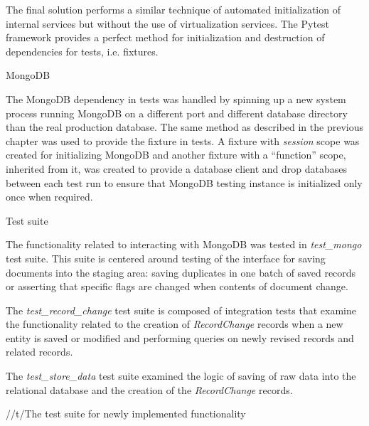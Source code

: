 The final solution performs a similar technique of automated initialization of internal services but without the use of virtualization services. The Pytest framework provides a perfect method for initialization and destruction of dependencies for tests, i.e. fixtures.


\beginsection
MongoDB

The MongoDB dependency in tests was handled by spinning up a new system process running MongoDB on a different port and different database directory than the real production database. The same method as described in the previous chapter was used to provide the fixture in tests. A fixture with {\it session} scope was created for initializing MongoDB and another fixture with a “function” scope, inherited from it, was created to provide a database client and drop databases between each test run to ensure that MongoDB testing instance is initialized only once when required.

\secc Test suite

The functionality related to interacting with MongoDB was tested in {\it test\_mongo} test suite. This suite is centered  around testing of the interface for saving documents into the staging area: saving duplicates in one batch of saved records or asserting that specific flags are changed when contents of document change. 

The {\it test\_record\_change} test suite is composed of integration tests that examine the functionality related to the creation of {\it RecordChange} records when a new entity is saved or modified and performing queries on newly revised records and related records. 

The {\it test\_store\_data} test suite examined the logic of saving of raw data into the relational database and the creation of the {\it RecordChange} records. 

\medskip
\centerline{
}
\raggedcenter/{\figure/t/The test suite for newly implemented functionality}
\medskip

